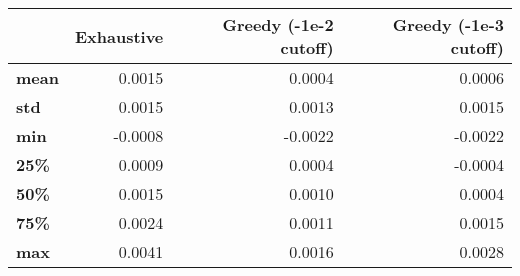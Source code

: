\begin{tabular}{lrrr}
\toprule
{} &  Exhaustive &  Greedy (-1e-2 cutoff) &  Greedy (-1e-3 cutoff) \\
\midrule
\textbf{mean} &      0.0015 &                 0.0004 &                 0.0006 \\
\textbf{std } &      0.0015 &                 0.0013 &                 0.0015 \\
\textbf{min } &     -0.0008 &                -0.0022 &                -0.0022 \\
\textbf{25\% } &      0.0009 &                 0.0004 &                -0.0004 \\
\textbf{50\% } &      0.0015 &                 0.0010 &                 0.0004 \\
\textbf{75\% } &      0.0024 &                 0.0011 &                 0.0015 \\
\textbf{max } &      0.0041 &                 0.0016 &                 0.0028 \\
\bottomrule
\end{tabular}
